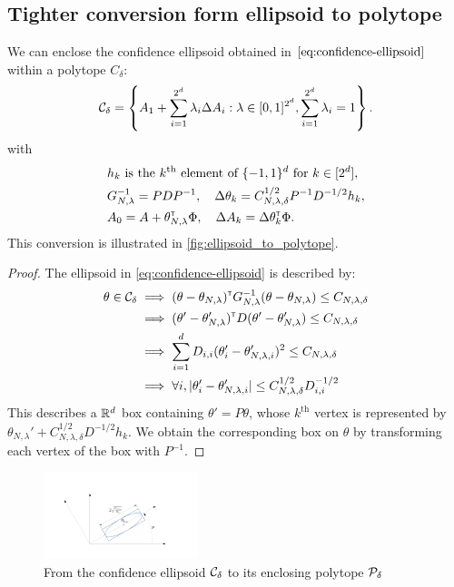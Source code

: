 \documentclass{article}
\begin{document}
\subsection{Tighter conversion form ellipsoid to polytope}
\label{sec:tight-polytope}
\begin{lemma}
\label{lem:tight_polytope}
We can enclose the confidence ellipsoid obtained in $\eqref{eq:confidence-ellipsoid}$ within a polytope $C_\delta$:
\begin{equation}
     \mathcal{C}_\delta = \left\{ A_{1}+\sum_{i=1}^{2^d}\lambda_{i}\Delta A_{i}: \lambda\in[0, 1]^{2^d},  \sum_{i=1}^{2^d}\lambda_{i}=1\right\}.
\end{equation}
with 
\begin{align*}
    &h_k \text{ is the }k^\text{th}\text{ element of }\{-1,1\}^d\text{ for } k\in[2^d],\\
    &G_{N,\lambda}^{-1} = PDP^{-1}, \quad \Delta\theta_k = C_{N,\lambda,\delta}^{1/2} P^{-1}D^{-1/2} h_k, \\
    &A_0 = A + \theta_{N,\lambda}^{\mathsf{\scriptscriptstyle T}}\Phi, \quad \Delta A_k = \Delta\theta_k^{\mathsf{\scriptscriptstyle T}}\Phi.
\end{align*}
This conversion is illustrated in \autoref{fig:ellipsoid_to_polytope}.
\end{lemma}

\begin{proof}
The ellipsoid in \eqref{eq:confidence-ellipsoid} is described by:
\begin{align*}
    \theta\in\mathcal{C}_\delta &\implies
    (\theta-\theta_{N,\lambda})^{\mathsf{\scriptscriptstyle T}} G_{N,\lambda}^{-1}(\theta-\theta_{N,\lambda}) \leq C_{N,\lambda,\delta}\\
    &\implies (\theta'-\theta'_{N,\lambda})^{\mathsf{\scriptscriptstyle T}} D (\theta'-\theta'_{N,\lambda}) \leq C_{N,\lambda,\delta}\\
    &\implies \sum_{i=1}^d D_{i,i}(\theta'_i-\theta'_{N,\lambda,i})^2\leq C_{N,\lambda,\delta}\\
    &\implies\forall i, |\theta'_i-\theta'_{N,\lambda,i}|\leq C_{N,\lambda,\delta}^{1/2}D_{i,i}^{-1/2}
\end{align*}
This describes a $\mathbb{R}^d$ box containing $\theta' = P\theta$, whose $k^\text{th}$ vertex is represented by $\theta_{N,\lambda}' + C_{N,\lambda,\delta}^{1/2}D^{-1/2} h_k$. We obtain the corresponding box on $\theta$ by transforming each vertex of the box with $P^{-1}$.
\end{proof}

\begin{figure}
    \centering
    \includegraphics[trim={3.8cm, 2cm, 5cm, 3.8cm}, clip, width=0.4\textwidth]{img/ellipsoid_to_polytope}
    \caption{From the confidence ellipsoid $\mathcal{C}_\delta$ to its enclosing polytope $\mathcal{P}_\delta$}
    \label{fig:ellipsoid_to_polytope}
\end{figure}
\end{document}

